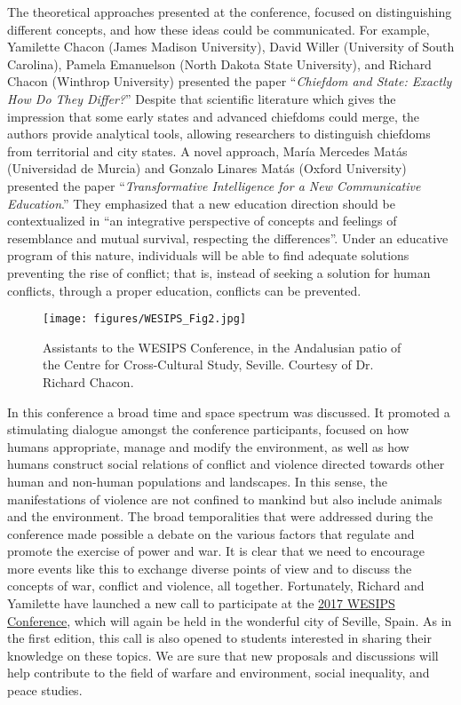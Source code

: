 
The theoretical  approaches presented at the conference, focused on distinguishing different concepts, and how these ideas could be communicated. For example, Yamilette Chacon (James Madison University), David Willer (University of South Carolina), Pamela Emanuelson (North Dakota State University), and Richard Chacon (Winthrop University) presented the paper “\emph{Chiefdom and State: Exactly How Do They Differ?}” Despite that scientific literature which gives the impression that some early states and advanced chiefdoms could merge, the authors provide analytical tools, allowing researchers to distinguish chiefdoms from territorial and city states. A novel approach, María Mercedes Matás (Universidad de Murcia) and Gonzalo Linares Matás (Oxford University) presented the paper “\emph{Transformative Intelligence for a New Communicative Education}.” They emphasized that a new education direction should be contextualized in “an integrative perspective of concepts and feelings of resemblance and mutual survival, respecting the differences”. Under an educative program of this nature, individuals will be able to find adequate solutions preventing the rise of conflict; that is, instead of seeking a solution for human conflicts, through a proper education, conflicts can be prevented. 
	\begin{figure}[!ht]
		\texttt{[image: figures/WESIPS\_Fig2.jpg]}
		\centering
		\caption{Assistants to the WESIPS Conference, in the Andalusian patio of the Centre for Cross-Cultural Study, Seville. Courtesy of Dr. Richard Chacon.}
		\label{fig:WESIPS_Fig2}
	\end{figure}
In this conference a broad time and space spectrum was discussed. It promoted a stimulating dialogue amongst the conference participants, focused on how humans appropriate, manage and modify the environment, as well as how humans construct social relations of conflict and violence directed towards other human and non-human populations and landscapes. In this sense, the manifestations of violence are not confined to mankind but also include animals and the environment. The broad temporalities that were addressed during the conference made possible a debate on the various factors that regulate and promote the exercise of power and war.  It is clear that we need to encourage more events like this to exchange diverse points of view and to discuss the concepts of war, conflict and violence, all together. Fortunately, Richard and Yamilette have launched a new call to participate at the \href{https://www.academia.edu/14533728/WESIPS_2017_Conference}{2017 WESIPS Conference}, which will again be held in the wonderful city of Seville, Spain.  As in the first edition, this call is also opened to students interested in sharing their knowledge on these topics. We are sure that new proposals and discussions will help contribute to the field of warfare and environment, social inequality, and peace studies.





\label{WESIPS:lastpage}
\closingarticle
